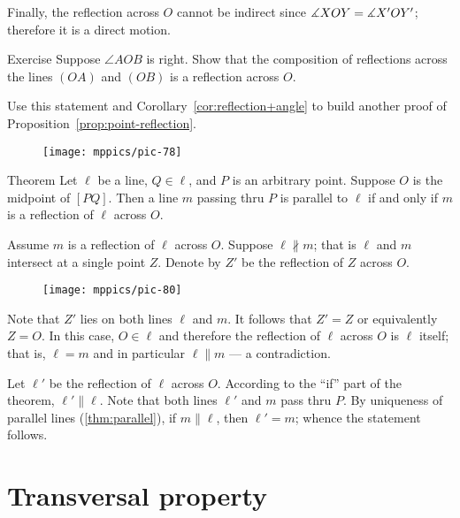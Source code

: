 Finally, the reflection across $O$ cannot be indirect since $\measuredangle XOY\z=\measuredangle X'OY'$;
therefore it is a direct motion.
\qeds

\begin{thm}{Exercise}
Suppose $\angle AOB$ is right.
Show that the composition of reflections across the lines $(OA)$ and $(OB)$ is a reflection across $O$.

Use this statement and Corollary~\ref{cor:reflection+angle} to build another proof of Proposition~\ref{prop:point-reflection}.
\end{thm}

{

\begin{wrapfigure}{r}{23mm}
\vskip-6mm
\centering
\texttt{[image: mppics/pic-78]}
\end{wrapfigure}


\begin{thm}{Theorem}\label{thm:parallel-point-reflection}
Let $\ell$ be a line, $Q\in \ell$, and $P$ is an arbitrary point.
Suppose $O$ is the midpoint of $[PQ]$.
Then a line $m$ passing thru $P$ is parallel to $\ell$ if and only if $m$ is a reflection of $\ell$ across $O$.
\end{thm}

}

Assume $m$ is a reflection of $\ell$ across $O$.
Suppose $\ell\nparallel m$; that is $\ell$ and $m$ intersect at a single point $Z$.
Denote by $Z'$ be the reflection of $Z$ across $O$.

\begin{figure}[!ht]
\centering
\texttt{[image: mppics/pic-80]}
\end{figure}

Note that $Z'$ lies on both lines $\ell$ and $m$.
It follows that $Z'=Z$ or equivalently $Z=O$.
In this case, $O\in \ell$ and therefore the reflection of $\ell$ across $O$ is $\ell$ itself;
that is, $\ell=m$ and in particular $\ell\parallel m$ --- a contradiction. 

Let $\ell'$ be the reflection of $\ell$ across $O$.
According to the ``if'' part of the theorem, $\ell'\parallel \ell$.
Note that both lines $\ell'$ and $m$ pass thru $P$.
By uniqueness of parallel lines (\ref{thm:parallel}), if $m\parallel \ell$, then $\ell'=m$; whence the statement follows.
\qeds

\section{Transversal property}

